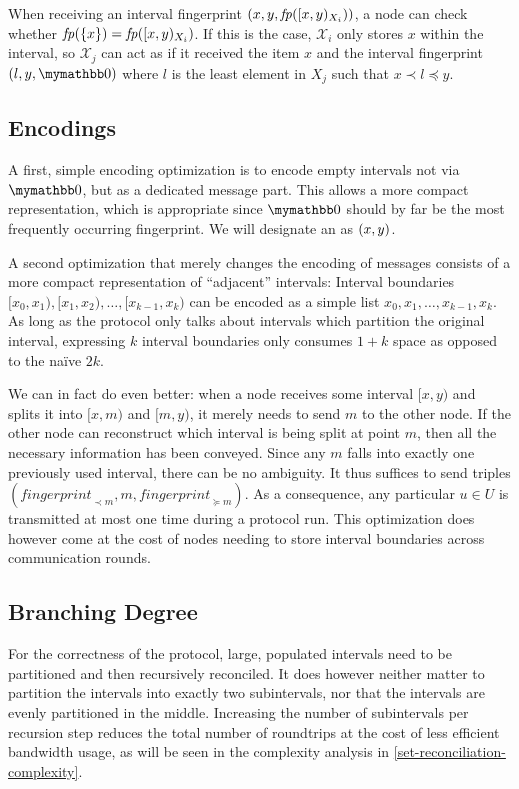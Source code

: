 When receiving an interval fingerprint $({x}, {y}, {\mathit{fp}([{x},{y})_{X_i})})$, a node can check whether $\mathit{fp}(\{x\}) =  \mathit{fp}([{x},{y})_{X_i})$. If this is the case, $\mathcal{X}_i$ only stores $x$ within the interval, so $\mathcal{X}_j$ can act as if it received the item $x$ and the interval fingerprint $\ifpmanual{l}{y}{\neutraladd}$ where $l$ is the least element in $X_j$ such that $x \prec l \preceq y$.

\subsection{Encodings}

A first, simple encoding optimization is to encode empty intervals not via $\neutraladd$, but as a dedicated message part. This allows a more compact representation, which is appropriate since $\neutraladd$ should by far be the most frequently occurring fingerprint. We will designate an  as $({x}, {y})$.

A second optimization that merely changes the encoding of messages consists of a more compact representation of ``adjacent'' intervals: Interval boundaries $[x_0, x_1), [x_1, x_2), \ldots, [x_{k - 1}, x_k)$ can be encoded as a simple list $x_0, x_1, \ldots, x_{k - 1}, x_k$. As long as the protocol only talks about intervals which partition the original interval, expressing $k$ interval boundaries only consumes $1 + k$ space as opposed to the naïve $2k$.

We can in fact do even better: when a node receives some interval $[x, y)$ and splits it into $[x, m)$ and $[m, y)$, it merely needs to send $m$ to the other node. If the other node can reconstruct which interval is being split at point $m$, then all the necessary information has been conveyed. Since any $m$ falls into exactly one previously used interval, there can be no ambiguity. It thus suffices to send triples $( \mathit{fingerprint}_{\prec m}, m, \mathit{fingerprint}_{\succeq m})$. As a consequence, any particular $u \in U$ is transmitted at most one time during a protocol run. This optimization does however come at the cost of nodes needing to store interval boundaries across communication rounds.

\subsection{Branching Degree}

For the correctness of the protocol, large, populated intervals need to be partitioned and then recursively reconciled. It does however neither matter to partition the intervals into exactly two subintervals, nor that the intervals are evenly partitioned in the middle. Increasing the number of subintervals per recursion step reduces the total number of roundtrips at the cost of less efficient bandwidth usage, as will be seen in the complexity analysis in \cref{set-reconciliation-complexity}.

